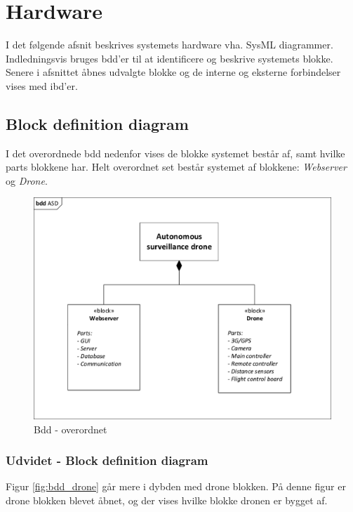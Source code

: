 \chapter{Hardware}

I det følgende afsnit beskrives systemets hardware vha. SysML diagrammer. 
Indledningsvis bruges bdd'er til at identificere og beskrive systemets blokke. Senere i afsnittet åbnes udvalgte blokke og de interne og eksterne forbindelser vises med ibd'er.

\section{Block definition diagram}
I det overordnede bdd nedenfor vises de blokke systemet består af, samt hvilke parts blokkene har. Helt overordnet set består systemet af blokkene: \textit{Webserver} og \textit{Drone}. 

\begin{figure}[H]
\centering
\includegraphics[width=1\textwidth]{Billeder/BDD/bdd_overordnet.pdf}
\vspace{-0.5cm}
\caption{Bdd - overordnet}
\label{fig:bdd_overordnet}
\end{figure}

\newpage
\subsection{Udvidet - Block definition diagram}
Figur \ref{fig:bdd_drone} går mere i dybden med drone blokken. På denne figur er drone blokken blevet åbnet, og der vises hvilke blokke dronen er bygget af. 


